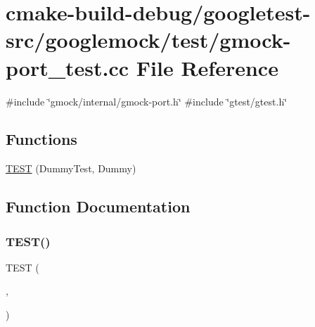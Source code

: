 \hypertarget{gmock-port__test_8cc}{}\section{cmake-\/build-\/debug/googletest-\/src/googlemock/test/gmock-\/port\+\_\+test.cc File Reference}
\label{gmock-port__test_8cc}
{\ttfamily \#include \char`\"{}gmock/internal/gmock-\/port.\+h\char`\"{}}\newline
{\ttfamily \#include \char`\"{}gtest/gtest.\+h\char`\"{}}\newline
\subsection*{Functions}
\begin{DoxyCompactItemize}
\item 
\mbox{\hyperlink{gmock-port__test_8cc_a63812c9ef0cbc6907a251ccf919da78e}{T\+E\+ST}} (Dummy\+Test, Dummy)
\end{DoxyCompactItemize}


\subsection{Function Documentation}
\mbox{\label{gmock-port__test_8cc_a63812c9ef0cbc6907a251ccf919da78e}} 
\subsubsection{\texorpdfstring{TEST()}{TEST()}}
{\footnotesize\ttfamily T\+E\+ST (\begin{DoxyParamCaption}\item[{Dummy\+Test}]{,  }\item[{Dummy}]{ }\end{DoxyParamCaption})}

